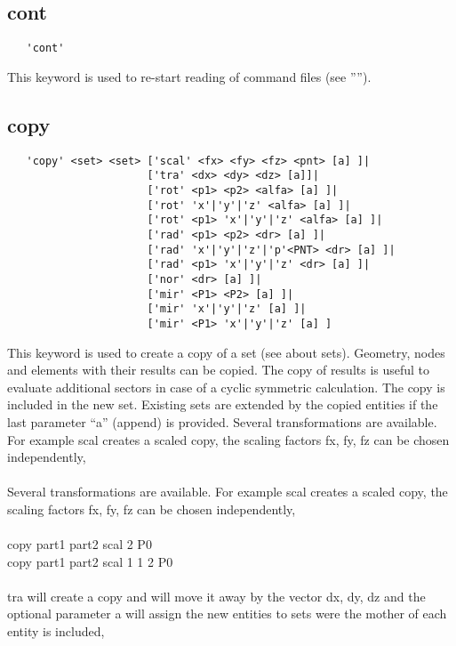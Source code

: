 \documentclass{article}
\begin{document}
\subsection{\label{cont}cont}
\begin{verbatim}
   'cont'
\end{verbatim}
This keyword is used to re-start reading of command files (see '''').

\subsection{\label{copy}copy}
\begin{verbatim}
   'copy' <set> <set> ['scal' <fx> <fy> <fz> <pnt> [a] ]|
                      ['tra' <dx> <dy> <dz> [a]]|
                      ['rot' <p1> <p2> <alfa> [a] ]|
                      ['rot' 'x'|'y'|'z' <alfa> [a] ]|
                      ['rot' <p1> 'x'|'y'|'z' <alfa> [a] ]|
                      ['rad' <p1> <p2> <dr> [a] ]|
                      ['rad' 'x'|'y'|'z'|'p'<PNT> <dr> [a] ]|
                      ['rad' <p1> 'x'|'y'|'z' <dr> [a] ]|
                      ['nor' <dr> [a] ]|
                      ['mir' <P1> <P2> [a] ]| 
                      ['mir' 'x'|'y'|'z' [a] ]| 
                      ['mir' <P1> 'x'|'y'|'z' [a] ] 
\end{verbatim}
This keyword is used to create a copy of a set (see  about sets). Geometry, nodes and elements with their results can be copied. The copy of results is useful to evaluate additional sectors in case of a cyclic symmetric calculation. The copy is included in the new set. Existing sets are extended by the copied entities if the last parameter ``a'' (append) is provided. Several transformations are available. For example scal creates a scaled copy, the scaling factors fx, fy, fz can be chosen independently,\\\\
Several transformations are available. For example scal creates a scaled copy, the scaling factors fx, fy, fz can be chosen independently,\\\\
copy part1 part2 scal 2 P0 \\
copy part1 part2 scal 1 1 2 P0\\\\
tra will create a copy and will move it away by the vector dx, dy, dz and the optional parameter a will assign the new entities to sets were the mother of each entity is included,\\\\
\end{document}
